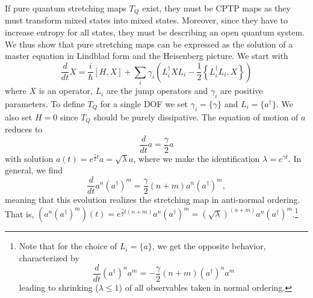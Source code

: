 \documentclass{SciPost}
\begin{document}
If pure quantum stretching maps $T_Q$ exist, they must be CPTP maps as they must transform mixed states into mixed states. Moreover, since they have to increase entropy for all states, they must be describing an open quantum system. We thus show that pure stretching maps can be expressed as the solution of a master equation in Lindblad form and the Heisenberg picture. We start with
\begin{equation}
	\frac{d}{d t} X=\frac{i}{\hbar}[H,X]+\sum_i \gamma_i \left(L_i^\dagger X L_i-\frac{1}{2}\left\{L_i^\dagger L_i,X\right\}\right)
\end{equation}
where $X$ is an operator, $L_i$ are the jump operators and $\gamma_i$ are positive parameters. To define $T_Q$ for a single DOF we set $\gamma_i=\{\gamma\}$ and $L_i=\{a^\dagger\}$. We also set $H=0$ since $T_Q$ should be purely dissipative. The equation of motion of $a$ reduces to
\begin{equation}
	\frac{d}{d t} a=\frac{\gamma}{2} a
\end{equation}
with solution $a(t)=e^{\frac{\gamma}{2} t} a = \sqrt{\lambda} a$, where we make the identification $\lambda=e^{\gamma t}$. 
In general, we find
\begin{equation}
	\frac{d}{d t} a^n (a^{\dagger})^m=\frac{\gamma}{2}(n+m)a^n (a^{\dagger})^m,
\end{equation}
meaning that this evolution realizes the stretching map in anti-normal ordering. That is, $(a^n (a^{\dagger})^m)(t)=e^{\frac{\gamma}{2} t (n+m)} a^n (a^{\dagger})^m = (\sqrt{\lambda})^{(n+m)} a^n (a^{\dagger})^m$.\footnote{Note that for the choice of $L_i=\{a\}$, we get the opposite behavior, characterized by
	\begin{equation}
		\frac{d}{d t} (a^{\dagger})^n a^m=-\frac{\gamma}{2}(n+m)(a^{\dagger})^n a^m
	\end{equation}
	leading to shrinking ($\lambda\leq1$) of all observables taken in normal ordering.}
\end{document}
